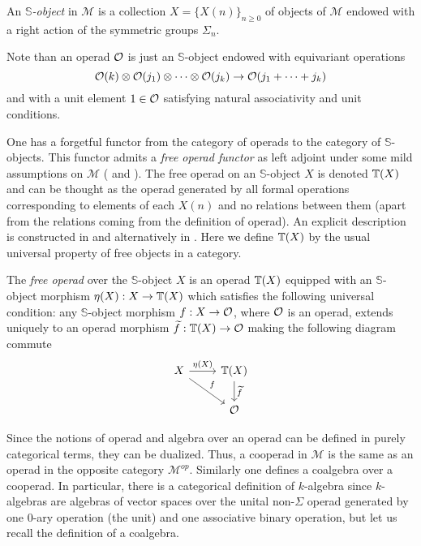 \documentclass[TFM.tex]{subfiles}
\begin{document}
\begin{defi}
 An \emph{$\mathbb{S}$-object} in $\mathscr{M}$ is a collection $X=\{X(n)\}_{n\geq 0}$ of objects of $\mathscr{M}$ endowed with a right action of the symmetric groups $\Sigma_n$.
\end{defi}

Note than an operad ${\mathcal O}$ is just an $\mathbb{S}$-object endowed with
equivariant operations
\[{\mathcal O}(k)\otimes{\mathcal O}(j_1)\otimes\cdots\otimes{\mathcal O}(j_k)\to {\mathcal O}(j_1+\cdots+j_k)\]
and with a unit element $1 \in{\mathcal O}$ satisfying natural associativity and unit conditions.




One has a forgetful functor from the category of operads to the category of $\mathbb{S}$-objects. This functor admits a \emph{free operad functor} as left adjoint under some mild assumptions on $\mathscr{M}$ (\cite{GJ} and \cite[]{AlgebraicOperads}). The free operad on an $\mathbb{S}$-object $X$ is denoted $\mathbb{T}(X)$ and can be thought as the operad generated by all formal operations corresponding to elements of each $X(n)$ and no relations between them (apart from the relations coming from the definition of operad). An explicit description is constructed in \cite{GJ} and alternatively in \cite{AlgebraicOperads}. Here we define $\mathbb{T}(X)$ by the usual universal property of free objects in a category. 

\begin{defi}
The \emph{free operad} over the $\mathbb{S}$-object $X$ is an operad $\mathbb{T}(X)$ equipped with an $\mathbb{S}$-object morphism $\eta(X):X\to\mathbb{T}(X)$ which satisfies the following universal condition: any $\mathbb{S}$-object morphism $f:X\to {\mathcal O}$, where ${\mathcal O}$ is an operad, extends uniquely to an operad morphism $\widetilde{f}:\mathbb{T}(X)\to{\mathcal O}$ making the following diagram commute
\[
\begin{tikzcd}
X\arrow[r, "\eta(X)"]\arrow[dr,"f"] & \T(X)\arrow[d, "\widetilde{f}"]\\
& \OO
\end{tikzcd}
\] 
\end{defi}

Since the notions of operad and algebra over an operad can be defined in purely categorical terms, they can be dualized. Thus, a cooperad in $\mathscr{M}$ is the same as an operad in the opposite category $\mathscr{M}^{op}$. Similarly one defines a coalgebra over a cooperad. In particular, there is a categorical definition of $k$-algebra since $k$-algebras are algebras of vector spaces over the unital non-$\Sigma$ operad generated by one 0-ary operation (the unit) and one associative binary operation, but let us recall the definition of a coalgebra.
\end{document}
